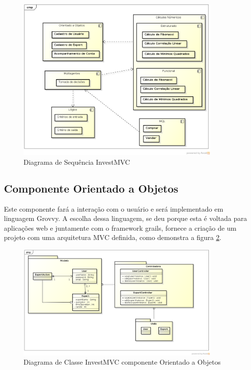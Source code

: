 \begin{figure}[H]
\centering
\includegraphics[width=0.9\textwidth]{figuras/componente}
\caption{Diagrama de Sequência InvestMVC}
\label{componente}
\end{figure}

\subsection{Componente Orientado a Objetos}

Este componente fará a interação com o usuário e será implementado em linguagem Grovvy. A escolha dessa linguagem, se deu porque esta é voltada para aplicações web e juntamente com  o framework grails, fornece a criação de um projeto com uma arquitetura MVC definida, como demonstra a figura \ref{classeOO}.

\begin{figure}[H]
\centering
\includegraphics[width=0.9\textwidth]{figuras/classeOO}
\caption{Diagrama de Classe InvestMVC componente Orientado a Objetos} 
\label{classeOO}
\end{figure}

